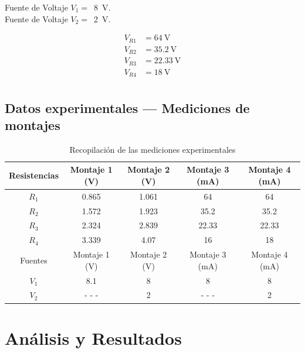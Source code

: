 \documentclass{article}
\begin{document}
\begin{enumerate}
        Fuente de Voltaje $V_1 =$~\SI{8}{\volt}.\\
        Fuente de Voltaje $V_2 =$~\SI{2}{\volt}.

        \begin{align*}
            V_{R1} &= 64~\unit{\volt}\\
            V_{R2} &= 35.2~\unit{\volt}\\
            V_{R3} &= 22.33~\unit{\volt}\\
            V_{R4} &= 18~\unit{\volt}\\
        \end{align*}

    \end{enumerate}

    \subsection*{Datos experimentales --- Mediciones de montajes}

    \begin{table}[ht]
        \centering
        \begin{tabular}{|c|c|c|c|c|} %
            \midrule 
            Resistencias    & Montaje 1 (\unit{\volt}) & Montaje 2 (\unit{\volt})   & Montaje 3 (\unit{\milli\ampere})    & Montaje 4 (\unit{\milli\ampere})    \\
            \midrule
            $R_1$           & 0.865 & 1.061 & 64    & 64    \\
            $R_2$           & 1.572 & 1.923 & 35.2  & 35.2  \\
            $R_3$           & 2.324 & 2.839 & 22.33 & 22.33 \\
            $R_4$           & 3.339 & 4.07  & 16    & 18    \\
            \midrule
            Fuentes         & Montaje 1 (\unit{\volt}) & Montaje 2 (\unit{\volt})   & Montaje 3 (\unit{\milli\ampere})    & Montaje 4 (\unit{\milli\ampere})    \\
            \midrule
            $V_1$           & 8.1   & 8 & 8     & 8 \\
            $V_2$           & - - - & 2 & - - - & 2 \\ %
            \midrule
        \end{tabular}
        \caption{Recopilación de las mediciones experimentales}\label{tab:3}
    \end{table}

    \section{Análisis y Resultados}
\end{document}
